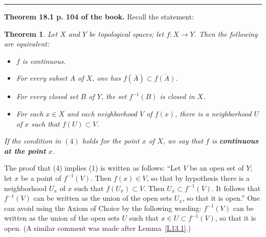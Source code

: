 \documentclass[12pt,letterpaper]{article}
\newtheorem{thm}{Theorem}%
\newcommand{\hs}{\bigskip\hrule\medskip}
\newcommand{\noi}{\noindent}%
\begin{document}
\hs

\noi\textbf{Theorem 18.1 p. 104 of the book.} Recall the statement:

\begin{thm}
Let $X$ and $Y$ be topological spaces; let $f: X \to Y$. Then the following are equivalent:
\begin{itemize}
    \item[$(1)$] $f$ is continuous.
    \item[$(2)$] For every subset $A$ of $X$, one has $f(\overline{A}) \subset \overline{f(A)}$.
    \item[$(3)$] For every closed set $B$ of $Y$, the set $f^{-1}(B)$ is closed in $X$.
    \item[$(4)$] For each $x \in X$ and each neighborhood $V$ of $f(x)$, there is a neighborhood $U$ of $x$ such that $f(U) \subset V$.
\end{itemize}
If the condition in $(4)$ holds for the point $x$ of $X$, we say that $f$ is \textbf{continuous at the point} $x$.
\end{thm} %

The proof that (4) implies (1) is written as follows: ``Let $V$ be an open set of $Y$; let $x$ be a point of $f^{-1}(V)$. Then $f(x) \in V$, so that by hypothesis there is a neighborhood $U_x$ of $x$ such that $f(U_x) \subset V$. Then $U_x \subset f^{-1}(V)$. It follows that $f^{-1}(V)$ can be written as the union of the open sets $U_x$, so that it is open.'' One can avoid using the Axiom of Choice by the following wording: $f^{-1}(V)$ can be written as the union of the open sets $U$ such that $x\in U\subset f^{-1}(V)$, so that it is open. (A similar comment was made after Lemma~\ref{L13.1}.) 
\end{document}
